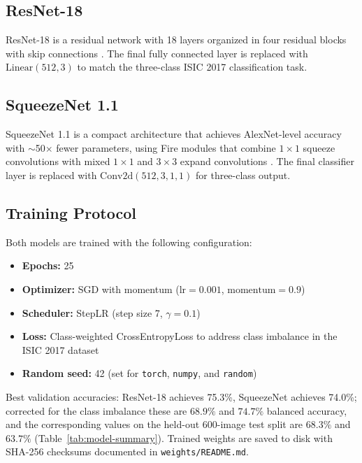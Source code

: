 \subsection{ResNet-18}

ResNet-18 is a residual network with 18 layers organized in four residual
blocks with skip connections \cite{he2016resnet}. The final
fully connected layer is replaced with $\text{Linear}(512, 3)$ to match the
three-class ISIC 2017 classification task.

\subsection{SqueezeNet 1.1}

SqueezeNet 1.1 is a compact architecture that achieves AlexNet-level accuracy
with $\sim$50$\times$ fewer parameters, using Fire modules that combine
$1 \times 1$ squeeze convolutions with mixed $1 \times 1$ and $3 \times 3$
expand convolutions \cite{iandola2016squeeze}. The final classifier layer is replaced with
$\text{Conv2d}(512, 3, 1, 1)$ for three-class output.

\subsection{Training Protocol}

Both models are trained with the following configuration:
\begin{itemize}
    \item \textbf{Epochs:} 25
    \item \textbf{Optimizer:} SGD with momentum ($\text{lr} = 0.001$,
    $\text{momentum} = 0.9$)
    \item \textbf{Scheduler:} StepLR (step size 7, $\gamma = 0.1$)
    \item \textbf{Loss:} Class-weighted CrossEntropyLoss to address class
    imbalance in the ISIC 2017 dataset
    \item \textbf{Random seed:} 42 (set for \texttt{torch}, \texttt{numpy},
    and \texttt{random})
\end{itemize}

Best validation accuracies: ResNet-18 achieves 75.3\%, SqueezeNet achieves
74.0\%; corrected for the class imbalance these are $68.9\%$ and $74.7\%$
balanced accuracy, and the corresponding values on the held-out 600-image
test split are $68.3\%$ and $63.7\%$ (Table~\ref{tab:model-summary}).
Trained weights are saved to disk with SHA-256 checksums documented
in \texttt{weights/README.md}.

